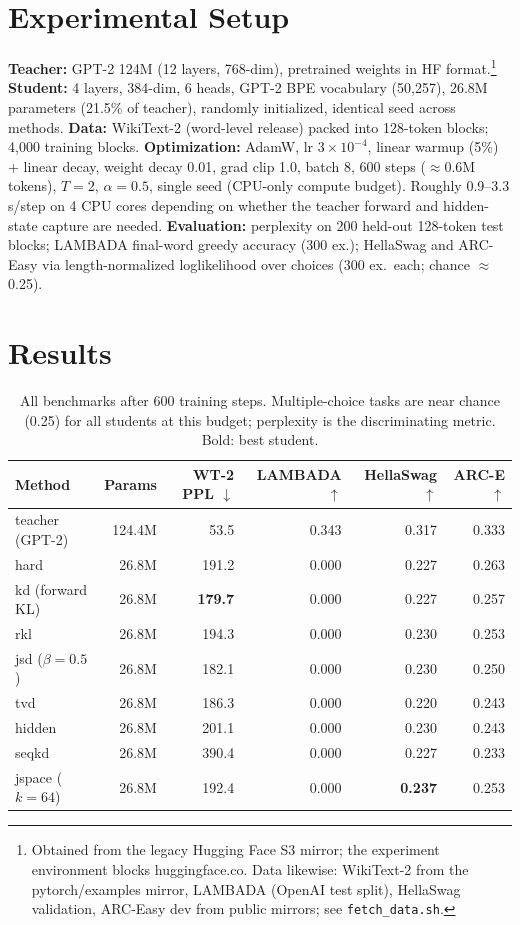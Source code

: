 \documentclass[11pt]{article}
\begin{document}
\section{Experimental Setup}
\label{sec:setup}
\textbf{Teacher:} GPT-2 124M (12 layers, 768-dim), pretrained weights in HF
format.\footnote{Obtained from the legacy Hugging Face S3 mirror; the
experiment environment blocks huggingface.co. Data likewise: WikiText-2
from the pytorch/examples mirror, LAMBADA (OpenAI test split), HellaSwag
validation, ARC-Easy dev from public mirrors; see \texttt{fetch\_data.sh}.}
\textbf{Student:} 4 layers, 384-dim, 6 heads, GPT-2 BPE vocabulary
(50{,}257), 26.8M parameters (21.5\% of teacher), randomly initialized,
identical seed across methods.
\textbf{Data:} WikiText-2 (word-level release) packed into 128-token
blocks; 4{,}000 training blocks.
\textbf{Optimization:} AdamW, lr $3{\times}10^{-4}$, linear warmup (5\%) +
linear decay, weight decay 0.01, grad clip 1.0, batch 8, 600 steps
($\approx$0.6M tokens), $T{=}2$, $\alpha{=}0.5$, single seed (CPU-only
compute budget). Roughly 0.9--3.3 s/step on 4 CPU cores depending on
whether the teacher forward and hidden-state capture are needed.
\textbf{Evaluation:} perplexity on 200 held-out 128-token test blocks;
LAMBADA final-word greedy accuracy (300 ex.); HellaSwag and ARC-Easy via
length-normalized loglikelihood over choices (300 ex.\ each; chance
$\approx$0.25).

\section{Results}
\label{sec:results}

\begin{table}[t]
\centering
\small
\begin{tabular}{lrrrrr}
\toprule
Method & Params & WT-2 PPL $\downarrow$ & LAMBADA $\uparrow$ & HellaSwag $\uparrow$ & ARC-E $\uparrow$ \\
\midrule
teacher (GPT-2) & 124.4M & 53.5 & 0.343 & 0.317 & 0.333 \\
\midrule
hard            & 26.8M & 191.2 & 0.000 & 0.227 & 0.263 \\
kd (forward KL) & 26.8M & \textbf{179.7} & 0.000 & 0.227 & 0.257 \\
rkl             & 26.8M & 194.3 & 0.000 & 0.230 & 0.253 \\
jsd ($\beta{=}0.5$) & 26.8M & 182.1 & 0.000 & 0.230 & 0.250 \\
tvd             & 26.8M & 186.3 & 0.000 & 0.220 & 0.243 \\
hidden          & 26.8M & 201.1 & 0.000 & 0.230 & 0.243 \\
seqkd           & 26.8M & 390.4 & 0.000 & 0.227 & 0.233 \\
jspace ($k{=}64$) & 26.8M & 192.4 & 0.000 & \textbf{0.237} & 0.253 \\
\bottomrule
\end{tabular}
\caption{All benchmarks after 600 training steps. Multiple-choice tasks
are near chance (0.25) for all students at this budget; perplexity is the
discriminating metric. Bold: best student.}
\label{tab:results}
\end{table}
\end{document}
